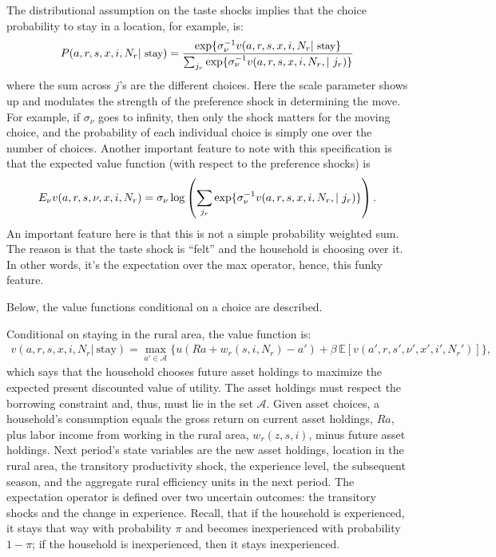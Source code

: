 \documentclass[pdftex,11pt]{article}
\begin{document}
The distributional assumption on the taste shocks implies that the choice probability to stay in a location, for example, is:
\begin{eqnarray*}
\small
P(a, r, s, x, i, N_r| \ \mbox{stay}) = \frac{\exp\{\sigma_{\nu}^{-1} v(a, r,  s, x, i, N_r | \ \mbox{stay}\}}{\sum_{j_r} \exp\{\sigma_{\nu}^{-1} v(a, r,  s, x, i, N_r, | \ j_r)\}}
\end{eqnarray*}
where the sum across $j$'s are the different choices. Here the scale parameter shows up and modulates the strength of the preference shock in determining the move. For example, if $\sigma_{\nu}$ goes to infinity, then only the shock matters for the moving choice, and the probability of each individual choice is simply one over the number of choices. Another important feature to note with this specification is that the expected value function (with respect to the preference shocks) is
\begin{eqnarray*}
\small
E_{\nu} v(a, r, s, \nu, x, i, N_r) = \sigma_{\nu} \log \left( \sum_{j_r} \exp\{\sigma_{\nu}^{-1} v(a, r,  s, x, i, N_r, | \ j_r)\} \right).
\end{eqnarray*}
An important feature here is that this is not a simple probability weighted sum. The reason is that the taste shock is ``felt'' and the household is choosing over it. In other words, it's the expectation over the max operator, hence, this funky feature.

Below, the value functions conditional on a choice are described.

Conditional on staying in the rural area, the value function is:
\begin{align}
v(a, r, s, x, i, N_r | \ \mbox{stay}) =  \max_{a'\in \mathcal{A}}\bigg  \{ u(Ra + w_{r}(s, i, N_r) - a' )  + \beta \, \mathbb{E} [v(a',r, s',\nu', x',i',N_r')]  \bigg\},
\label{eq:bellman_rural_stay}
\end{align}
which says that the household chooses future asset holdings to maximize the expected present discounted value of utility. The asset holdings must respect the borrowing constraint and, thus, must lie in the set $\mathcal{A}$. Given asset choices, a household's consumption equals the gross return on current asset holdings, $Ra$, plus labor income from working in the rural area, $w_{r}(z, s, i)$, minus future asset holdings. Next period's state variables are the new asset holdings, location in the rural area, the transitory productivity shock, the experience level, the subsequent season, and the aggregate rural efficiency units in the next period. The expectation operator is defined over two uncertain outcomes: the transitory shocks and the change in experience. Recall, that if the household is experienced, it stays that way with probability $\pi$ and becomes inexperienced with probability $1-\pi$; if the household is inexperienced, then it stays inexperienced.
\end{document}
